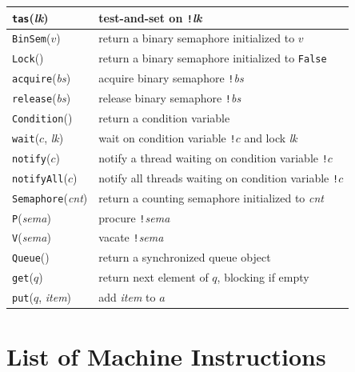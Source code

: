 \documentclass{report}
\begin{document}
\vspace{1em}
\begin{tabular}{|l|l|}
\hline
\texttt{tas}(\textit{lk}) & test-and-set on \texttt{!}\textit{lk} \\
\hline
\texttt{BinSem}($v$) & return a binary semaphore initialized to $v$ \\
\hline
\texttt{Lock}() & return a binary semaphore initialized to \texttt{False} \\
\hline
\texttt{acquire}(\textit{bs}) & acquire binary semaphore \texttt{!}\textit{bs} \\
\hline
\texttt{release}(\textit{bs}) & release binary semaphore \texttt{!}\textit{bs} \\
\hline
\texttt{Condition}() & return a condition variable \\
\hline
\texttt{wait}($c$, \textit{lk}) & wait on condition variable \texttt{!}$c$
and lock \textit{lk} \\ \hline
\texttt{notify}($c$) & notify a thread waiting on condition variable \texttt{!}$c$ \\
\hline
\texttt{notifyAll}($c$) & notify all threads waiting on condition variable \texttt{!}$c$ \\
\hline
\texttt{Semaphore}(\textit{cnt}) & return a counting semaphore initialized to \textit{cnt} \\
\hline
\texttt{P}(\textit{sema}) & procure \texttt{!}\textit{sema}  \\
\hline
\texttt{V}(\textit{sema}) & vacate \texttt{!}\textit{sema}  \\
\hline
\texttt{Queue}() & return a synchronized queue object \\
\hline
\texttt{get}($q$) & return next element of $q$, blocking if empty \\
\hline
\texttt{put}($q$, \textit{item}) & add \textit{item} to $a$ \\
\hline
\end{tabular}

\chapter{List of Machine Instructions}
\label{ap:harmonybytecode}
\end{document}
